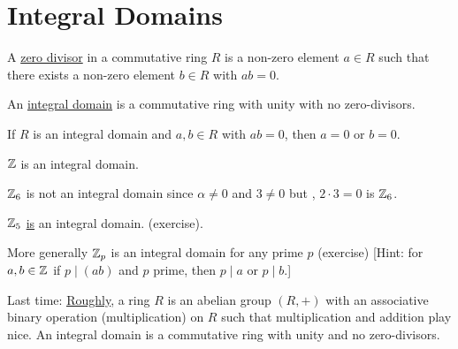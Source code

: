 \documentclass[]{article}
\begin{document}
\section{Integral Domains}
\begin{definition}
	A \ul{zero divisor} in a commutative ring $R$ is a non-zero element $a\in R$ such that there exists a non-zero element $b\in R$ with $ab=0$.
\end{definition}
\begin{definition}
	An \ul{integral domain} is a commutative ring with unity with no zero-divisors.
\end{definition}
\begin{remark}
	If $R$ is an integral domain and $a,b\in R$ with $ab=0$, then $a=0$ or $b=0$.
\end{remark}
\begin{example}
	$\mathbb{Z}$ is an integral domain.
\end{example}
\begin{example}
	$\mathbb{Z}_6$ is not an integral domain since $\alpha\neq0$ and $3\neq0$ but , $2\cdot3=0$ is $\mathbb{Z}_6$.
\end{example}
\begin{example}
	$\mathbb{Z}_5$ \ul{is} an integral domain. (exercise).
\end{example}
More generally $\mathbb{Z}_p$ is an integral domain for any prime $p$ (exercise) [Hint: for $a,b\in\mathbb{Z}$ if $p\mid(ab)$ and $p$ prime, then $p\mid a$ or $p\mid b$.]

Last time: \ul{\ul{Roughly}}, a ring $R$ is an abelian group $(R,+)$ with an associative binary operation (multiplication) on $R$ such that multiplication and addition play nice.
An integral domain is a commutative ring with unity and no zero-divisors.
\end{document}
